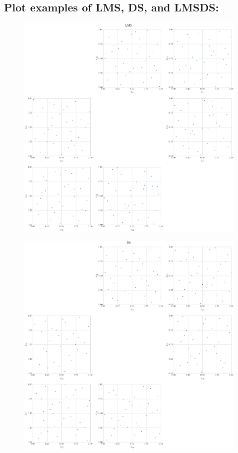 \subsection*{Plot examples of LMS, DS, and LMS\textunderscore DS:}

   \begin{figure}[H]
    \centering
    \includegraphics[width = 0.99 \linewidth]{LMS_DS_Halton/lms.png}
    \end{figure}
    \begin{figure}[H]
    \centering
    \includegraphics[width = 0.99 \linewidth]{LMS_DS_Halton/ds.png}
    \end{figure}
